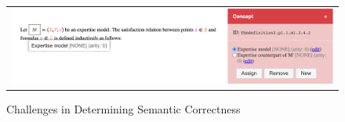 \begin{figure}[htpb]
  \centering
  \begin{tabular}{c}
    \includegraphics[width=14cm]{images/semantic-incorrectness.png}
  \end{tabular}
  \caption[Semantic Correctness]{Challenges in Determining Semantic Correctness}\label{fig:semantic-incorrectness}
\end{figure}
